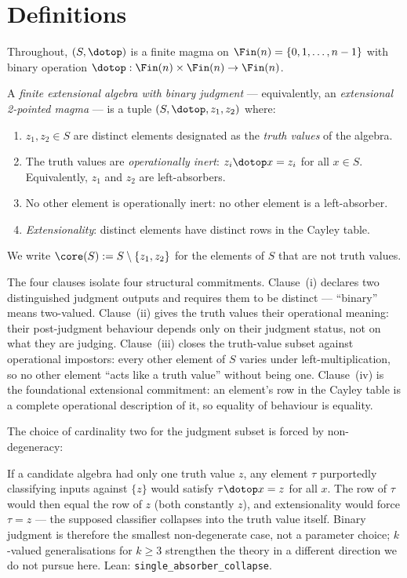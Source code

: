 \section{Definitions}
\label{sec:definitions}

Throughout, $(S, \dotop)$ is a finite magma on
$\Fin(n) = \{0, 1, \ldots, n-1\}$ with binary operation
$\dotop : \Fin(n) \times \Fin(n) \to \Fin(n)$.

\begin{definition}
\label{def:epm}
A \emph{finite extensional algebra with binary judgment} --- equivalently,
an \emph{extensional 2-pointed magma} --- is a tuple
$(S, \dotop, z_1, z_2)$ where:
\begin{enumerate}
  \item $z_1, z_2 \in S$ are distinct elements designated as the
    \emph{truth values} of the algebra.
  \item The truth values are \emph{operationally inert}: $z_i \dotop x = z_i$
    for all $x \in S$. Equivalently, $z_1$ and $z_2$ are left-absorbers.
  \item No other element is operationally inert: no other element is a
    left-absorber.
  \item \emph{Extensionality}: distinct elements have distinct rows in
    the Cayley table.
\end{enumerate}
We write $\core(S) := S \setminus \{z_1, z_2\}$ for the elements of $S$
that are not truth values.
\end{definition}

The four clauses isolate four structural commitments. Clause~(i) declares
two distinguished judgment outputs and requires them to be distinct ---
``binary'' means two-valued. Clause~(ii) gives the truth values their
operational meaning: their post-judgment behaviour depends only on
their judgment status, not on what they are judging. Clause~(iii) closes
the truth-value subset against operational impostors: every other element
of $S$ varies under left-multiplication, so no other element ``acts like
a truth value'' without being one. Clause~(iv) is the foundational
extensional commitment: an element's row in the Cayley table is a
complete operational description of it, so equality of behaviour is
equality.

The choice of cardinality two for the judgment subset is forced by
non-degeneracy:

\begin{remark}
\label{rem:single-judgment}
If a candidate algebra had only one truth value $z$, any element
$\tau$ purportedly classifying inputs against $\{z\}$ would satisfy
$\tau \dotop x = z$ for all $x$. The row of $\tau$ would then equal the
row of $z$ (both constantly $z$), and extensionality would force
$\tau = z$ --- the supposed classifier collapses into the truth value
itself. Binary judgment is therefore the smallest non-degenerate case,
not a parameter choice; $k$-valued generalisations for $k \geq 3$
strengthen the theory in a different direction we do not pursue here.
Lean: \texttt{single\_absorber\_collapse}.
\end{remark}


